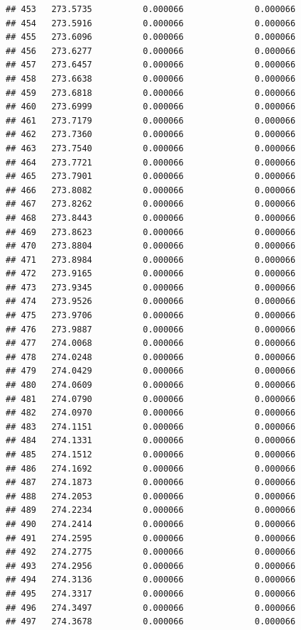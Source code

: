 \documentclass[
]{article}
\begin{document}
\begin{verbatim}
## 453   273.5735          0.000066              0.000066
## 454   273.5916          0.000066              0.000066
## 455   273.6096          0.000066              0.000066
## 456   273.6277          0.000066              0.000066
## 457   273.6457          0.000066              0.000066
## 458   273.6638          0.000066              0.000066
## 459   273.6818          0.000066              0.000066
## 460   273.6999          0.000066              0.000066
## 461   273.7179          0.000066              0.000066
## 462   273.7360          0.000066              0.000066
## 463   273.7540          0.000066              0.000066
## 464   273.7721          0.000066              0.000066
## 465   273.7901          0.000066              0.000066
## 466   273.8082          0.000066              0.000066
## 467   273.8262          0.000066              0.000066
## 468   273.8443          0.000066              0.000066
## 469   273.8623          0.000066              0.000066
## 470   273.8804          0.000066              0.000066
## 471   273.8984          0.000066              0.000066
## 472   273.9165          0.000066              0.000066
## 473   273.9345          0.000066              0.000066
## 474   273.9526          0.000066              0.000066
## 475   273.9706          0.000066              0.000066
## 476   273.9887          0.000066              0.000066
## 477   274.0068          0.000066              0.000066
## 478   274.0248          0.000066              0.000066
## 479   274.0429          0.000066              0.000066
## 480   274.0609          0.000066              0.000066
## 481   274.0790          0.000066              0.000066
## 482   274.0970          0.000066              0.000066
## 483   274.1151          0.000066              0.000066
## 484   274.1331          0.000066              0.000066
## 485   274.1512          0.000066              0.000066
## 486   274.1692          0.000066              0.000066
## 487   274.1873          0.000066              0.000066
## 488   274.2053          0.000066              0.000066
## 489   274.2234          0.000066              0.000066
## 490   274.2414          0.000066              0.000066
## 491   274.2595          0.000066              0.000066
## 492   274.2775          0.000066              0.000066
## 493   274.2956          0.000066              0.000066
## 494   274.3136          0.000066              0.000066
## 495   274.3317          0.000066              0.000066
## 496   274.3497          0.000066              0.000066
## 497   274.3678          0.000066              0.000066

\end{verbatim}
\end{document}
